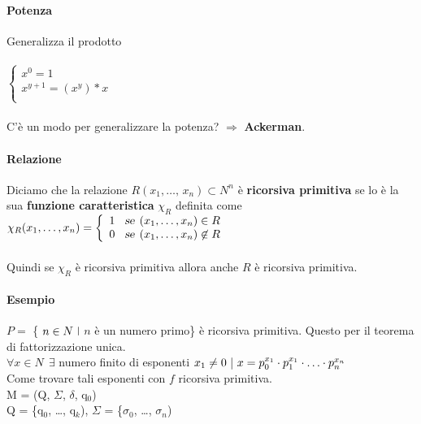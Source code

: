 \documentclass[10pt]{book}
\begin{document}
\begin{multicols}{2}
\paragraph{Potenza}
Generalizza il prodotto\\\\
\begin{math}
		\left\{
		\begin{array}{l}
			x^0 = 1\\
			x^{y + 1} = (x^y) * x\\
		\end{array}
		\right.
\end{math}\\\\
C'è un modo per generalizzare la potenza? $\Rightarrow$ \textbf{Ackerman}.
\end{multicols}

\paragraph{Relazione} Diciamo che la relazione $R(x_1,\ldots,\,x_n) \subset N^n$ è \textbf{ricorsiva primitiva} se lo è la sua \textbf{funzione caratteristica} $\chi_R$ definita come\\
\begin{math}
\chi_R(x_1,\ldots, x_n) = 
		\left\{
		\begin{array}{l}
			1 \:\:\:\:\textsl{se}\:\: (x_1, \ldots, x_n) \in R\\
			0 \:\:\:\:\textsl{se}\:\: (x_1, \ldots, x_n) \not\in R
		\end{array}
		\right.
\end{math}\\\\
Quindi se $\chi_R$ è ricorsiva primitiva allora anche $R$ è ricorsiva primitiva.

\paragraph{Esempio} $P =$ \{ $n \in N\:\:\vline$ $n$ è un numero primo\} è ricorsiva primitiva. Questo per il teorema di fattorizzazione unica.\\
$\forall x \in N\:\:\exists$ numero finito di esponenti $x_1 \neq 0\:\:\vline\:\: x = p_0^{x_1}\cdot p_1^{x_1}\cdot\ldots\cdot p_n^{x_n}$\\
Come trovare tali esponenti con $f$ ricorsiva primitiva.\\
M = (Q, $\Sigma$, $\delta$, q$_0$)\\
Q = \{q$_0$, \ldots, q$_k$), $\Sigma$ = \{$\sigma_0$, \ldots, $\sigma_n$)\\
\end{document}
